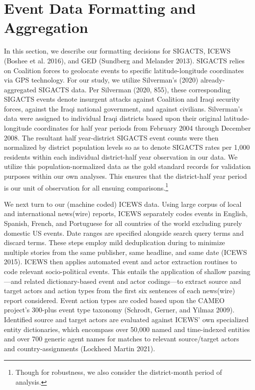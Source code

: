 \documentclass[12pt]{article}
\begin{document}
\section{Event Data Formatting and Aggregation}

In this section, we describe our formatting decisions for SIGACTS, ICEWS (Boshee et al. 2016), and GED (Sundberg and Melander 2013). SIGACTS relies on Coalition forces to geolocate events to specific latitude-longitude coordinates via GPS technology. For our study, we utilize Silverman's (2020) already-aggregated SIGACTS data. Per Silverman (2020, 855), these corresponding SIGACTS events denote insurgent attacks against Coalition and Iraqi security forces, against the Iraqi national government, and against civilians. Silverman's data were assigned to individual Iraqi districts based upon their original latitude-longitude coordinates for half year periods from February 2004 through December 2008. The resultant half year-district SIGACTS event counts were then normalized by district population levels so as to denote SIGACTS rates per 1,000 residents within each individual district-half year observation in our data. We utilize this population-normalized data as the gold standard records for validation purposes within our own analyses. This ensures that the district-half year period is our unit of observation for all ensuing comparisons.\footnote{Though for robustness, we also consider the district-month period of analysis.}

We next turn to our (machine coded) ICEWS data. Using large corpus of local and international news(wire) reports, ICEWS separately codes events in English, Spanish, French, and Portuguese for all countries of the world excluding purely domestic US events. Date ranges are specified alongside search query terms and discard terms. These steps employ mild deduplication during to minimize multiple stories from the same publisher, same headline, and same date (ICEWS 2015). ICEWS then applies automated event and actor extraction routines to code relevant socio-political events. This entails the application of shallow parsing---and related dictionary-based event and actor codings---to extract source and target actors and action types from the first six sentences of each news(wire) report considered. Event action types are coded based upon the CAMEO project's 300-plus event type taxonomy (Schrodt, Gerner, and Yilmaz 2009). Identified source and target actors are evaluated against ICEWS' own specialized entity dictionaries, which encompass over 50,000 named and time-indexed entities and over 700 generic agent names for matches to relevant source/target actors and country-assignments (Lockheed Martin 2021).
\end{document}
